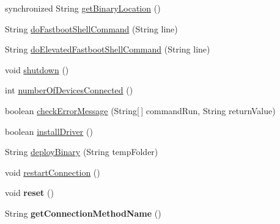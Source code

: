\begin{DoxyCompactItemize}
\item 
synchronized String \hyperlink{class_c_a_s_u_a_l_1_1communicationstools_1_1fastboot_1_1_fastboot_tools_a0d097e91058ad5e3044a57f59f3a9b66}{get\-Binary\-Location} ()
\item 
String \hyperlink{class_c_a_s_u_a_l_1_1communicationstools_1_1fastboot_1_1_fastboot_tools_a2255ac9ccc09b18fc555df63a6896beb}{do\-Fastboot\-Shell\-Command} (String line)
\item 
String \hyperlink{class_c_a_s_u_a_l_1_1communicationstools_1_1fastboot_1_1_fastboot_tools_af003ab47f7135092eb61125149383092}{do\-Elevated\-Fastboot\-Shell\-Command} (String line)
\item 
void \hyperlink{class_c_a_s_u_a_l_1_1communicationstools_1_1fastboot_1_1_fastboot_tools_a6de34295662b787efdc2a224fe16ae17}{shutdown} ()
\item 
int \hyperlink{class_c_a_s_u_a_l_1_1communicationstools_1_1fastboot_1_1_fastboot_tools_ad02d565e0fcc303feee9b27bc0df226e}{number\-Of\-Devices\-Connected} ()
\item 
boolean \hyperlink{class_c_a_s_u_a_l_1_1communicationstools_1_1fastboot_1_1_fastboot_tools_adf2300cad8f26c288225e7fc8ba93d61}{check\-Error\-Message} (String\mbox{[}$\,$\mbox{]} command\-Run, String return\-Value)
\item 
boolean \hyperlink{class_c_a_s_u_a_l_1_1communicationstools_1_1fastboot_1_1_fastboot_tools_aa340f086c997154a4392ec5eba25609a}{install\-Driver} ()
\item 
String \hyperlink{class_c_a_s_u_a_l_1_1communicationstools_1_1fastboot_1_1_fastboot_tools_aafba4b9d791ba42c88a1a46fa8af8e3f}{deploy\-Binary} (String temp\-Folder)
\item 
void \hyperlink{class_c_a_s_u_a_l_1_1communicationstools_1_1fastboot_1_1_fastboot_tools_ae184d155d0308cf12171d4a3e92de6f3}{restart\-Connection} ()
\item 
\hypertarget{class_c_a_s_u_a_l_1_1communicationstools_1_1fastboot_1_1_fastboot_tools_a969b74a1ac4e0e4e3abfd050c8185a2d}{void {\bfseries reset} ()}\label{class_c_a_s_u_a_l_1_1communicationstools_1_1fastboot_1_1_fastboot_tools_a969b74a1ac4e0e4e3abfd050c8185a2d}

\item 
\hypertarget{class_c_a_s_u_a_l_1_1communicationstools_1_1fastboot_1_1_fastboot_tools_a9678592d9da4804da844231e93bf695b}{String {\bfseries get\-Connection\-Method\-Name} ()}\label{class_c_a_s_u_a_l_1_1communicationstools_1_1fastboot_1_1_fastboot_tools_a9678592d9da4804da844231e93bf695b}

\end{DoxyCompactItemize}


